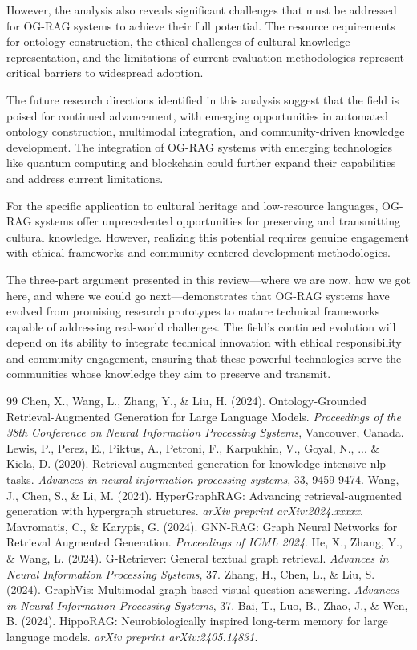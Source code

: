 \documentclass[12pt]{report}
\begin{document}
However, the analysis also reveals significant challenges that must be addressed for OG-RAG systems to achieve their full potential. The resource requirements for ontology construction, the ethical challenges of cultural knowledge representation, and the limitations of current evaluation methodologies represent critical barriers to widespread adoption.

The future research directions identified in this analysis suggest that the field is poised for continued advancement, with emerging opportunities in automated ontology construction, multimodal integration, and community-driven knowledge development. The integration of OG-RAG systems with emerging technologies like quantum computing and blockchain could further expand their capabilities and address current limitations.

For the specific application to cultural heritage and low-resource languages, OG-RAG systems offer unprecedented opportunities for preserving and transmitting cultural knowledge. However, realizing this potential requires genuine engagement with ethical frameworks and community-centered development methodologies.

The three-part argument presented in this review—where we are now, how we got here, and where we could go next—demonstrates that OG-RAG systems have evolved from promising research prototypes to mature technical frameworks capable of addressing real-world challenges. The field's continued evolution will depend on its ability to integrate technical innovation with ethical responsibility and community engagement, ensuring that these powerful technologies serve the communities whose knowledge they aim to preserve and transmit.

\begin{thebibliography}{99}
 Chen, X., Wang, L., Zhang, Y., \& Liu, H. (2024). Ontology-Grounded Retrieval-Augmented Generation for Large Language Models. \textit{Proceedings of the 38th Conference on Neural Information Processing Systems}, Vancouver, Canada.
 Lewis, P., Perez, E., Piktus, A., Petroni, F., Karpukhin, V., Goyal, N., ... \& Kiela, D. (2020). Retrieval-augmented generation for knowledge-intensive nlp tasks. \textit{Advances in neural information processing systems}, 33, 9459-9474.
 Wang, J., Chen, S., \& Li, M. (2024). HyperGraphRAG: Advancing retrieval-augmented generation with hypergraph structures. \textit{arXiv preprint arXiv:2024.xxxxx}.
 Mavromatis, C., \& Karypis, G. (2024). GNN-RAG: Graph Neural Networks for Retrieval Augmented Generation. \textit{Proceedings of ICML 2024}.
 He, X., Zhang, Y., \& Wang, L. (2024). G-Retriever: General textual graph retrieval. \textit{Advances in Neural Information Processing Systems}, 37.
 Zhang, H., Chen, L., \& Liu, S. (2024). GraphVis: Multimodal graph-based visual question answering. \textit{Advances in Neural Information Processing Systems}, 37.
 Bai, T., Luo, B., Zhao, J., \& Wen, B. (2024). HippoRAG: Neurobiologically inspired long-term memory for large language models. \textit{arXiv preprint arXiv:2405.14831}.
\end{thebibliography}
\end{document}
